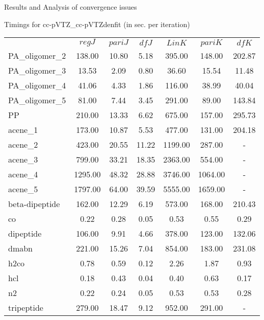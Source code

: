 \begin{frame}{Results and Analysis of convergence issues}
\footnotesize

\begin{center}
Timings for cc-pVTZ\_cc-pVTZdenfit (in sec. per iteration)
\begin{tabular}{lcccccc}
\hline
& $regJ$ & $pariJ$ & $dfJ$ & $LinK$ & $pariK$ & $dfK$ \\ 
PA\_oligomer\_2 & 138.00 & 10.80 & 5.18 & 395.00 & 148.00 & 202.87 \\ 
PA\_oligomer\_3 & 13.53 & 2.09 & 0.80 & 36.60 & 15.54 & 11.48 \\ 
PA\_oligomer\_4 & 41.06 & 4.33 & 1.86 & 116.00 & 38.99 & 40.04 \\ 
PA\_oligomer\_5 & 81.00 & 7.44 & 3.45 & 291.00 & 89.00 & 143.84 \\ 
PP & 210.00 & 13.33 & 6.62 & 675.00 & 157.00 & 295.73 \\ 
acene\_1 & 173.00 & 10.87 & 5.53 & 477.00 & 131.00 & 204.18 \\ 
acene\_2 & 423.00 & 20.55 & 11.22 & 1199.00 & 287.00 & - \\ 
acene\_3 & 799.00 & 33.21 & 18.35 & 2363.00 & 554.00 & - \\ 
acene\_4 & 1295.00 & 48.32 & 28.88 & 3746.00 & 1064.00 & - \\ 
acene\_5 & 1797.00 & 64.00 & 39.59 & 5555.00 & 1659.00 & - \\ 
beta-dipeptide & 162.00 & 12.29 & 6.19 & 573.00 & 168.00 & 210.43 \\ 
co & 0.22 & 0.28 & 0.05 & 0.53 & 0.55 & 0.29 \\ 
dipeptide & 106.00 & 9.91 & 4.66 & 378.00 & 123.00 & 132.06 \\ 
dmabn & 221.00 & 15.26 & 7.04 & 854.00 & 183.00 & 231.08 \\ 
h2co & 0.78 & 0.59 & 0.12 & 2.26 & 1.87 & 0.93 \\ 
hcl & 0.18 & 0.43 & 0.04 & 0.40 & 0.63 & 0.17 \\ 
n2 & 0.22 & 0.24 & 0.05 & 0.53 & 0.53 & 0.28 \\ 
tripeptide & 279.00 & 18.47 & 9.12 & 952.00 & 291.00 & - \\ 
\hline
\end{tabular}
\end{center}

\end{frame}






